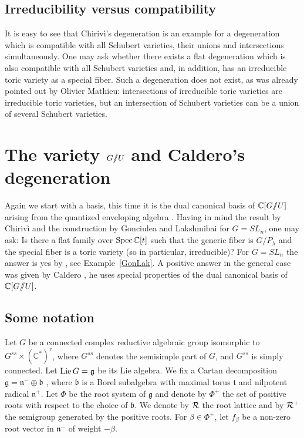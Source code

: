 \documentclass{emsprocart}
\theoremstyle{definition}
\begin{document}
\subsection{Irreducibility versus compatibility}
It is easy to see that Chiriv\`i's degeneration is an example for a degeneration which is compatible with all
Schubert varieties, their unions and intersections simultaneously. One may ask whether there exists a flat degeneration which is
also compatible with all Schubert varieties and, in addition, has an irreducible toric variety as a special fiber. Such a degeneration
does not exist, as was already pointed out by Olivier Mathieu: intersections of irreducible toric varieties
are irreducible toric varieties, but an intersection of Schubert varieties can be a union of
several Schubert varieties.


\section{The \texorpdfstring{variety ${G/\hskip -4.0pt/U}$}{flag variety} and Caldero's degeneration}\label{GnachU}
Again we start with a basis, this time it is the dual canonical basis of $\mathbb C[{G/\hskip -4.0pt/U}]$ arising from
the quantized enveloping algebra \cite{Ka,Lu1,Lu2}. Having in mind
the result by Chiriv\`i and the construction by Gonciulea and Lakshmibai for $G = SL_n$, one may ask:
Is there a flat family over $\hbox{Spec\,}\mathbb C[t]$ such that the generic fiber
is $G/P_\lambda$ and the special fiber is a toric variety (so in particular, irreducible)?
For $G=SL_n$ the answer is yes by \cite{GL}, see Example~\ref{GonLak}. A positive answer in the general case
was given by Caldero \cite{Ca1}, he uses special properties of the dual canonical basis
of $\mathbb C[G/\hskip -3.5pt/U]$.

\subsection{Some notation} Let $G$ be a connected complex reductive algebraic group
isomorphic to $G^{ss}\times (\mathbb C^*)^r$, where $G^{ss}$ denotes the semisimple part of $G$,
and $G^{ss}$ is simply connected. Let $\hbox{Lie\,}G=\mathfrak g$  be its Lie algebra.
We fix a Cartan decomposition $\mathfrak g=\mathfrak n^-\oplus\mathfrak b$  , where
$\mathfrak b$ is a Borel subalgebra with maximal torus $\mathfrak t$ and nilpotent radical
$\mathfrak n^+$.  Let $\Phi$ be the root system of $\mathfrak g$ and denote by $\Phi^+$ the set of
positive roots with respect to the choice of $\mathfrak b$. We denote by ${\cal R}$ the root lattice and by
${\cal R}^+$ the semigroup generated by the positive roots. For $\beta\in \Phi^+$, let
$f_\beta$ be a non-zero root vector in $\mathfrak n^-$ of weight $-\beta$.
\end{document}
